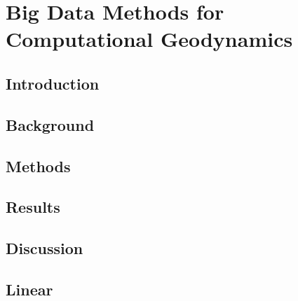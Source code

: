 \documentclass[letterpaper,10pt,english]{jupyterBook}
\begin{document}
\chapter{Big Data Methods for Computational Geodynamics}
\label{\detokenize{content/chapter_06_advanced/abstract:big-data-methods-for-computational-geodynamics}}\label{\detokenize{content/chapter_06_advanced/abstract::doc}}

\section{Introduction}
\label{\detokenize{content/chapter_06_advanced/section01_introduction:introduction}}\label{\detokenize{content/chapter_06_advanced/section01_introduction::doc}}

\section{Background}
\label{\detokenize{content/chapter_06_advanced/section02_background:background}}\label{\detokenize{content/chapter_06_advanced/section02_background::doc}}

\section{Methods}
\label{\detokenize{content/chapter_06_advanced/section03_methods:methods}}\label{\detokenize{content/chapter_06_advanced/section03_methods::doc}}

\section{Results}
\label{\detokenize{content/chapter_06_advanced/section04_results:results}}\label{\detokenize{content/chapter_06_advanced/section04_results::doc}}

\section{Discussion}
\label{\detokenize{content/chapter_06_advanced/section05_discussion:discussion}}\label{\detokenize{content/chapter_06_advanced/section05_discussion::doc}}

\section{Linear}
\label{\detokenize{content/chapter_06_advanced/conclusion:linear}}\label{\detokenize{content/chapter_06_advanced/conclusion::doc}}
\end{document}
